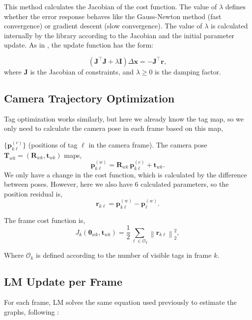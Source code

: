 This method calculates the Jacobian of the cost function. The value of $\lambda$ defines whether the error response behaves like the Gauss-Newton method (fast convergence) or gradient descent (slow convergence). The value of $\lambda$ is calculated internally by the library according to the Jacobian and the initial parameter update. As in \cite{turkulainen20243dgs}, the update function has the form:

\begin{equation}
	\left( \mathbf{J}^\top \mathbf{J} + \lambda \mathbf{I} \right) \Delta \mathbf{x} = - \mathbf{J}^\top \mathbf{r},
\end{equation}
where $\mathbf{J}$ is the Jacobian of constraints, and $\lambda \ge 0$ is the damping factor.

\subsection{Camera Trajectory Optimization}
Tag optimization works similarly, but here we already know the tag map, so we only need to calculate the camera pose in each frame based on this map,

$\{\mathbf{p}^{(c)}_{k\ell}\}$ (positions of tag $\ell$ in the camera frame). The camera pose $\mathbf{T}_{wk} = (\mathbf{R}_{wk}, \mathbf{t}_{wk})$ maps, \cite{Hartley2004}
\begin{equation}
	\mathbf{p}^{(w)}_{k\ell} = \mathbf{R}_{wk} \, \mathbf{p}^{(c)}_{k\ell} + \mathbf{t}_{wk}.
\end{equation}
We only have a change in the cost function, which is calculated by the difference between poses. However, here we also have 6 calculated parameters, so the position residual is, \cite{barfoot2024state}
\begin{equation}
	\mathbf{r}_{k\ell} = \mathbf{p}^{(w)}_{k\ell} - \mathbf{p}^{(w)}_{\ell}.
\end{equation}

The frame cost function is, \cite{barfoot2024state}
\begin{equation}
	J_k(\bm{\theta}_{wk}, \mathbf{t}_{wk}) = \frac{1}{2} \sum_{\ell \in \mathcal{O}_k} \left\| \mathbf{r}_{k\ell} \right\|_2^2,
\end{equation}

Where $\mathcal{O}_k$ is defined according to the number of visible tags in frame $k$.

\subsection{LM Update per Frame}
For each frame, LM solves the same equation used previously to estimate the graphs, following \cite{turkulainen20243dgs}:

